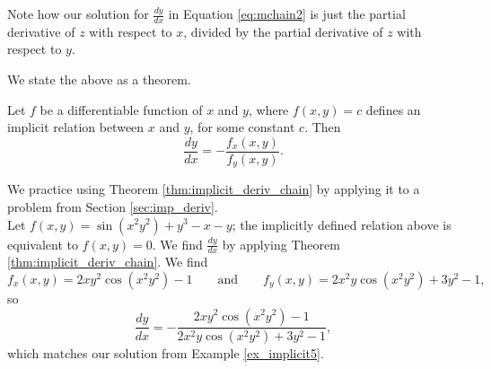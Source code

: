 Note how our solution for $\frac{dy}{dx}$ in Equation \eqref{eq:mchain2} is just the partial derivative of $z$ with respect to $x$, divided by the partial derivative of $z$ with respect to $y$.

We state the above as a theorem.

{Let $f$ be a differentiable function of $x$ and $y$, where $f(x,y)=c$ defines an implicit relation between $x$ and $y$, for some constant $c$. Then
$$\frac{dy}{dx} = - \frac{f_x(x,y)}{f_y(x,y)}.$$
}

We practice using Theorem \ref{thm:implicit_deriv_chain} by applying it to a problem from Section \ref{sec:imp_deriv}.\\

{Let $f(x,y) = \sin(x^2y^2)+y^3-x-y$; the implicitly defined relation above is equivalent to $f(x,y)=0$. We find $\frac{dy}{dx}$ by applying Theorem \ref{thm:implicit_deriv_chain}. We find 
$$f_x(x,y) = 2xy^2\cos(x^2y^2)-1\qquad \text{and}\qquad f_y(x,y) = 2x^2y\cos(x^2y^2)+3y^2-1,$$
so 
$$\frac{dy}{dx} = -\frac{2xy^2\cos(x^2y^2)-1}{2x^2y\cos(x^2y^2)+3y^2-1},$$
which matches our solution from Example \ref{ex_implicit5}.
}\\


